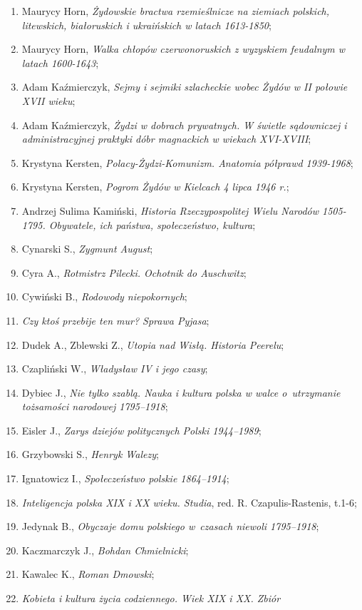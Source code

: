 \documentclass[a4paper,11pt]{article}
\begin{document}
\begin{enumerate}
\item Maurycy Horn, \emph{Żydowskie bractwa rzemieślnicze na ziemiach
    polskich, litewskich, białoruskich i ukraińskich w latach
    1613-1850};
\item Maurycy Horn, \emph{Walka chłopów czerwonoruskich z wyzyskiem
    feudalnym w latach 1600-1643};
\item Adam Kaźmierczyk, \emph{Sejmy i sejmiki szlacheckie wobec Żydów
    w II połowie XVII wieku};
\item Adam Kaźmierczyk, \emph{Żydzi w dobrach prywatnych. W świetle
    sądowniczej i administracyjnej praktyki dóbr magnackich w wiekach
    XVI-XVIII};
\item Krystyna Kersten, \emph{Polacy-Żydzi-Komunizm. Anatomia półprawd
    1939-1968};
\item Krystyna Kersten, \emph{Pogrom Żydów w Kielcach 4 lipca 1946
    r.};
\item Andrzej Sulima Kamiński, \emph{Historia Rzeczypospolitej Wielu
    Narodów 1505-1795. Obywatele, ich państwa, społeczeństwo,
    kultura};
\item Cynarski S., \emph{Zygmunt August};
\item Cyra A., \emph{Rotmistrz Pilecki. Ochotnik do Auschwitz};
\item Cywiński B., \emph{Rodowody niepokornych};
\item \emph{Czy ktoś przebije ten mur? Sprawa Pyjasa};
\item Dudek A., Zblewski Z., \emph{Utopia nad Wisłą. Historia
    Peerelu};
\item Czapliński W., \emph{Władysław IV i jego czasy};
\item Dybiec J., \emph{Nie tylko szablą. Nauka i kultura polska w
    walce o~utrzymanie tożsamości narodowej 1795--1918};
\item Eisler J., \emph{Zarys dziejów politycznych Polski 1944--1989};
\item Grzybowski S., \emph{Henryk Walezy};
\item Ignatowicz I., \emph{Społeczeństwo polskie 1864--1914};
\item \emph{Inteligencja polska XIX i XX wieku. Studia}, red. R.
  Czapulis-Rastenis, t.1-6;
\item Jedynak B., \emph{Obyczaje domu polskiego w~czasach niewoli
    1795--1918};
\item Kaczmarczyk J., \emph{Bohdan Chmielnicki};
\item Kawalec K., \emph{Roman Dmowski};
\item \emph{Kobieta i kultura życia codziennego. Wiek XIX i XX. Zbiór
}
\end{enumerate}
\end{document}
